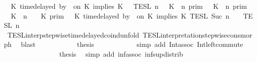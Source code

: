 \begin{isabellebody}
\ {\isacartoucheopen}{\isasymlbrakk}{\isasymlbrakk}\ {\isacharparenleft}K\ time{\isacharminus}delayed\ by\ {\isasymdelta}{\isasymtau}\ on\ K\ implies\ K\ {\isacharhash}\ {\isasymPsi}\ {\isasymrbrakk}{\isasymrbrakk}\isactrlsub T\isactrlsub E\isactrlsub S\isactrlsub L\isactrlbsup {\isasymge}\ n\isactrlesup \ {\isacharequal}\ {\isacharparenleft}{\isasymlbrakk}\ K\ {\isasymnot}{\isasymUp}\ n\ {\isasymrbrakk}\isactrlsub p\isactrlsub r\isactrlsub i\isactrlsub m\ {\isasymunion}\ {\isasymlbrakk}\ K\ {\isasymUp}\ n\ {\isasymrbrakk}\isactrlsub p\isactrlsub r\isactrlsub i\isactrlsub m\ {\isasyminter}\ {\isasymlbrakk}\ K\ {\isacharat}\ n\ {\isasymoplus}\ {\isasymdelta}{\isasymtau}\ {\isasymRightarrow}\ K\ {\isasymrbrakk}\isactrlsub p\isactrlsub r\isactrlsub i\isactrlsub m{\isacharparenright}\ {\isasyminter}\ {\isasymlbrakk}\ K\ time{\isacharminus}delayed\ by\ {\isasymdelta}{\isasymtau}\ on\ K\ implies\ K\ {\isasymrbrakk}\isactrlsub T\isactrlsub E\isactrlsub S\isactrlsub L\isactrlbsup {\isasymge}\ Suc\ n\isactrlesup \ {\isasyminter}\ {\isasymlbrakk}{\isasymlbrakk}\ {\isasymPsi}\ {\isasymrbrakk}{\isasymrbrakk}\isactrlsub T\isactrlsub E\isactrlsub S\isactrlsub L\isactrlbsup {\isasymge}\ n\isactrlesup {\isacartoucheclose}\isanewline
\ \ \ \ \ \ \ \ \ \ \isamarkupfalse%
\ TESL{\isacharunderscore}interp{\isacharunderscore}stepwise{\isacharunderscore}timedelayed{\isacharunderscore}coind{\isacharunderscore}unfold\ TESL{\isacharunderscore}interpretation{\isacharunderscore}stepwise{\isacharunderscore}cons{\isacharunderscore}morph\ \isamarkupfalse%
\ blast\isanewline
\ \ \ \ \ \ \ \ \isamarkupfalse%
\ \isamarkupfalse%
\ {\isacharquery}thesis\isanewline
\ \ \ \ \ \ \ \ \ \ \isamarkupfalse%
\ {\isacharparenleft}simp\ add{\isacharcolon}\ Int{\isacharunderscore}assoc\ Int{\isacharunderscore}left{\isacharunderscore}commute{\isacharparenright}\isanewline
\ \ \ \ \ \ \isamarkupfalse%
\isanewline
\ \ \ \ \ \ \isamarkupfalse%
\ \isamarkupfalse%
\ {\isacharquery}thesis\ \isamarkupfalse%
\ {\isacharparenleft}simp\ add{\isacharcolon}\ inf{\isacharunderscore}assoc\ inf{\isacharunderscore}sup{\isacharunderscore}distrib{}{\isacharparenright}\isanewline
\ \ \ \ \isamarkupfalse%

\end{isabellebody}
